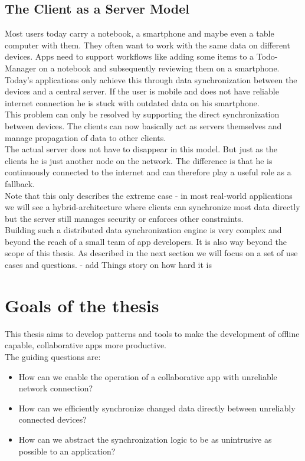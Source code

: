 \subsection{The Client as a Server Model}
Most users today carry a notebook, a smartphone and maybe even a table computer with them. They often want to work with the same data on different devices. Apps need to support workflows like adding some items to a Todo-Manager on a notebook and subsequently reviewing them on a smartphone. Today's applications only achieve this through  data synchronization between the devices and a central server. If the user is mobile and does not have reliable internet connection he is stuck with outdated data on his smartphone.\\
This problem can only be resolved by supporting the direct synchronization between devices. The clients can now basically act as servers themselves and manage propagation of data to other clients.\\
The actual server does not have to disappear in this model. But just as the clients he is just another node on the network. The difference is that he is continuously connected to the internet and can therefore play a useful role as a fallback.\\
Note that this only describes the extreme case - in most real-world applications we will see a hybrid-architecture where clients can synchronize most data directly but the server still manages security or enforces other constraints.\\
Building such a distributed data synchronization engine is very complex and beyond the reach of a small team of app developers. It is also way beyond the scope of this thesis. As described in the next section we will focus on a set of use cases and questions.
- add Things story on how hard it is

\section{Goals of the thesis}
This thesis aims to develop patterns and tools to make the development of offline capable, collaborative apps more productive.\\

The guiding questions are:
\begin{itemize}
\item How can we enable the operation of a collaborative app with unreliable network connection?
\item How can we efficiently synchronize changed data directly between unreliably connected devices?
\item How can we abstract the synchronization logic to be as unintrusive as possible to an application?\\
\end{itemize}

